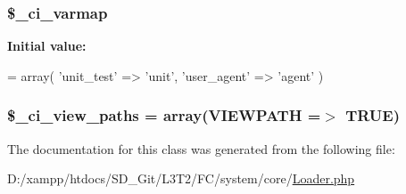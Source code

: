 \subsubsection[{\$\+\_\+ci\+\_\+varmap}]{\setlength{\rightskip}{0pt plus 5cm}\$\+\_\+ci\+\_\+varmap\hspace{0.3cm}{\ttfamily [protected]}}\label{class_c_i___loader_a8dd33a8ab99688451b1f811f122d1114}
{\bfseries Initial value\+:}
\begin{DoxyCode}
=   array(
        \textcolor{stringliteral}{'unit\_test'} => \textcolor{stringliteral}{'unit'},
        \textcolor{stringliteral}{'user\_agent'} => \textcolor{stringliteral}{'agent'}
    )
\end{DoxyCode}
\hypertarget{class_c_i___loader_adc48c64c673b28c2447ea4214a27eeea}{}
\subsubsection[{\$\+\_\+ci\+\_\+view\+\_\+paths}]{\setlength{\rightskip}{0pt plus 5cm}\$\+\_\+ci\+\_\+view\+\_\+paths = array({\bf V\+I\+E\+W\+P\+A\+T\+H} =$>$ T\+R\+U\+E)\hspace{0.3cm}{\ttfamily [protected]}}\label{class_c_i___loader_adc48c64c673b28c2447ea4214a27eeea}


The documentation for this class was generated from the following file\+:\begin{DoxyCompactItemize}
\item 
D\+:/xampp/htdocs/\+S\+D\+\_\+\+Git/\+L3\+T2/\+F\+C/system/core/\hyperlink{_loader_8php}{Loader.\+php}\end{DoxyCompactItemize}
